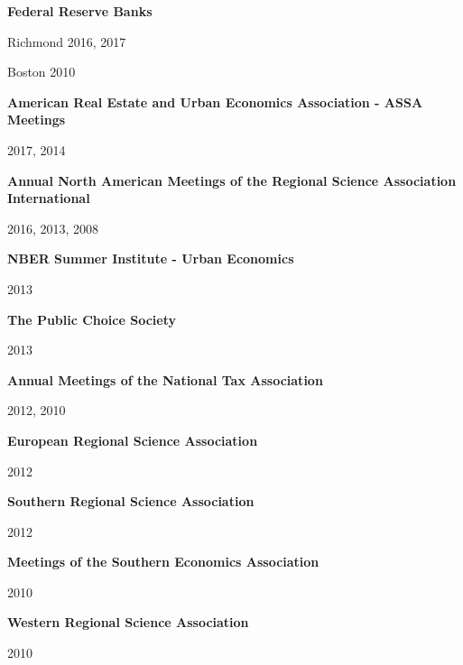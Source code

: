 \documentclass[10pt]{article}
\begin{document}
\begin{outerlist}
\item[] \textbf{Federal Reserve Banks}
    \begin{innerlist}
    \item[] Richmond 2016, 2017
    \item[] Boston  2010
    \end{innerlist}
\item[] \textbf{American Real Estate and Urban Economics Association - ASSA Meetings}
    \begin{innerlist}
    \item[] 2017, 2014
    \end{innerlist}
\item[] \textbf{Annual North American Meetings of the Regional Science Association International}
    \begin{innerlist}
    \item[] 2016, 2013, 2008
    \end{innerlist}
\item[] \textbf{NBER Summer Institute - Urban Economics}
    \begin{innerlist}
    \item[] 2013
    \end{innerlist}
\item[] \textbf{The Public Choice Society}
    \begin{innerlist}
    \item[] 2013
    \end{innerlist}
\item[] \textbf{Annual Meetings of the National Tax Association}
    \begin{innerlist}
    \item[] 2012, 2010
    \end{innerlist}
\item[] \textbf{European Regional Science Association}
    \begin{innerlist}
    \item[] 2012
    \end{innerlist}
\item[] \textbf{Southern Regional Science Association}
    \begin{innerlist}
    \item[] 2012
    \end{innerlist}
\item[] \textbf{Meetings of the Southern Economics Association}
    \begin{innerlist}
    \item[] 2010
    \end{innerlist}
\item[] \textbf{Western Regional Science Association}
    \begin{innerlist}
    \item[] 2010
    \end{innerlist}
\end{outerlist}
\end{document}
